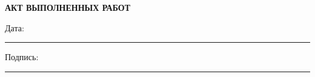\documentclass[12pt]{article}
\begin{document}
\begin{center}
\textbf{\LARGE АКТ ВЫПОЛНЕННЫХ РАБОТ}
\end{center}

\vspace{1cm}


\vfill

\noindent
Дата: \rule{5cm}{0.4pt} \hfill Подпись: \rule{5cm}{0.4pt}
\end{document}
